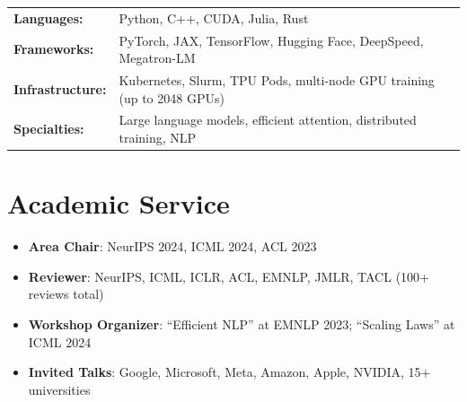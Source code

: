 \documentclass[11pt,a4paper]{article}
\begin{document}
\begin{tabularx}{\textwidth}{@{}lX@{}}
\textbf{Languages:} & Python, C++, CUDA, Julia, Rust \\
\textbf{Frameworks:} & PyTorch, JAX, TensorFlow, Hugging Face, DeepSpeed, Megatron-LM \\
\textbf{Infrastructure:} & Kubernetes, Slurm, TPU Pods, multi-node GPU training (up to 2048 GPUs) \\
\textbf{Specialties:} & Large language models, efficient attention, distributed training, NLP \\
\end{tabularx}

\section{Academic Service}

\begin{itemize}[leftmargin=1.5em, nosep, itemsep=3pt]
  \item \textbf{Area Chair}: NeurIPS 2024, ICML 2024, ACL 2023
  \item \textbf{Reviewer}: NeurIPS, ICML, ICLR, ACL, EMNLP, JMLR, TACL (100+ reviews total)
  \item \textbf{Workshop Organizer}: ``Efficient NLP'' at EMNLP 2023; ``Scaling Laws'' at ICML 2024
  \item \textbf{Invited Talks}: Google, Microsoft, Meta, Amazon, Apple, NVIDIA, 15+ universities
\end{itemize}
\end{document}
